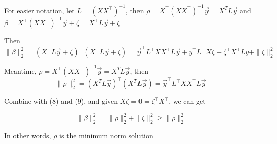 \begin{answer}

For easier notation, let  $L = (X X^\top)^{-1}$, then $\rho=X^\top (X X^\top)^{-1}\vec{y} = X^T L \vec y$ and $\beta=X^\top (XX^\top)^{-1}\vec{y}+\zeta = X^\top L \vec{y} + \zeta$

Then 
\begin{equation}
    \|\beta\|_2^2= (X^\top L \vec{y} + \zeta)^\top (X^\top L \vec{y} + \zeta) = \vec y^\top L^\top X X^\top L \vec y + y^\top L^\top X \zeta + \zeta^\top X^\top L y +  \|\zeta\|_2^2
\end{equation}

Meantime, $\rho=X^\top (X X^\top)^{-1}\vec{y} = X^T L \vec y$, then 
\begin{equation}
    \|\rho\|_2^2 = (X^T L \vec y)^\top (X^T L \vec y) = \vec y^\top L^\top X X^\top L \vec y
\end{equation}

Combine with (8) and (9), and given $X\zeta = 0 = \zeta^\top X^\top$, we can get 

\begin{equation}
    \|\beta\|_2^2=\|\rho\|_2^2+\|\zeta\|_2^2 \ge \|\rho\|_2^2
\end{equation}

In other words, $\rho$ is the minimum norm solution  
\end{answer}